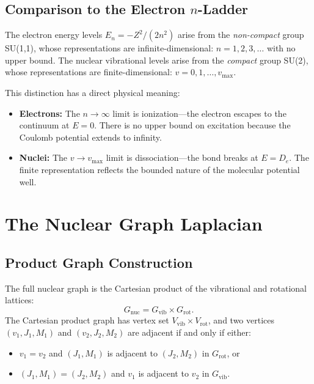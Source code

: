 \documentclass[aps,pra,twocolumn,superscriptaddress,longbibliography]{revtex4-2}
\begin{document}
\subsection{Comparison to the Electron $n$-Ladder}

The electron energy levels $E_n = -Z^2/(2n^2)$ arise from the
\emph{non-compact} group SU(1,1), whose representations are
infinite-dimensional: $n = 1, 2, 3, \ldots$ with no upper bound.  The
nuclear vibrational levels arise from the \emph{compact} group SU(2),
whose representations are finite-dimensional: $v = 0, 1, \ldots,
v_{\max}$.

This distinction has a direct physical meaning:
\begin{itemize}
\item \textbf{Electrons:} The $n \to \infty$ limit is ionization---the
electron escapes to the continuum at $E = 0$.  There is no upper bound
on excitation because the Coulomb potential extends to infinity.
\item \textbf{Nuclei:} The $v \to v_{\max}$ limit is
dissociation---the bond breaks at $E = D_e$.  The finite representation
reflects the bounded nature of the molecular potential well.
\end{itemize}


\section{The Nuclear Graph Laplacian}
\label{sec:nuclear_graph}

\subsection{Product Graph Construction}

The full nuclear graph is the Cartesian product of the vibrational and
rotational lattices:
\begin{equation}
G_{\mathrm{nuc}} = G_{\mathrm{vib}} \times G_{\mathrm{rot}}.
\label{eq:product}
\end{equation}
The Cartesian product graph has vertex set
$V_{\mathrm{vib}} \times V_{\mathrm{rot}}$, and two vertices
$(v_1, J_1, M_1)$ and $(v_2, J_2, M_2)$ are adjacent if and only if
either:
\begin{itemize}
\item $v_1 = v_2$ and $(J_1, M_1)$ is adjacent to $(J_2, M_2)$ in
  $G_{\mathrm{rot}}$, or
\item $(J_1, M_1) = (J_2, M_2)$ and $v_1$ is adjacent to $v_2$ in
  $G_{\mathrm{vib}}$.
\end{itemize}
\end{document}
